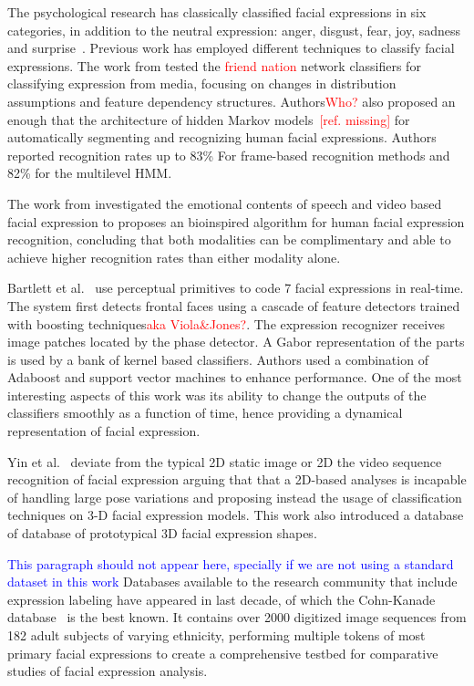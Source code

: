 \documentclass[]{article}
\begin{document}
The psychological research has classically classified facial
expressions in six categories, in addition to the neutral expression:
anger, disgust, fear, joy, sadness and
surprise~\cite{schmidt2002human}. Previous work has employed different
techniques to classify  facial expressions. The work from
\cite{Cohen2003160} tested the \textcolor{red}{friend nation} network
classifiers for classifying expression from media, focusing on changes
in distribution assumptions and feature dependency
structures. Authors\textcolor{red}{Who?} also proposed an enough that
the architecture of hidden Markov
models~\textcolor{red}{[ref. missing]} for automatically segmenting and  
recognizing human facial expressions. Authors reported recognition
rates up to 83\% For frame-based recognition methods and 82\% for the
multilevel HMM.

The work from \cite{Chen670976} investigated the emotional contents of speech and video based facial expression to
proposes an bioinspired algorithm for human facial expression recognition, concluding that both modalities can be
complimentary and able to achieve higher recognition rates than either modality alone.


Bartlett et al.~\cite{Bartlett4624313} use perceptual primitives to
code 7 facial expressions in real-time. The system first detects
frontal faces using a cascade of feature detectors trained
with boosting techniques\textcolor{red}{aka Viola\&Jones?}. The
expression recognizer receives image patches located by the phase
detector. A Gabor representation of the parts is used  by a bank of
kernel based classifiers. Authors used a combination of Adaboost and
support vector machines to enhance performance. One of the most
interesting aspects of this work was its ability to change the
outputs of the classifiers smoothly as a function of time, hence
providing a dynamical representation of facial expression.

Yin et al.~\cite{lijunyin} deviate from the typical 2D static
image or 2D the video sequence recognition of facial expression 
arguing that that a 2D-based analyses is incapable of handling large
pose variations and proposing instead the usage of classification
techniques on 3-D facial expression models. This work also introduced
a database of database of prototypical 3D facial expression shapes.

\textcolor{blue}{This paragraph should not appear here, specially if we are not using a
  standard dataset in this work}
Databases available to the research community that include expression
labeling have appeared in last decade, of which the Cohn-Kanade
database~\cite{Cohn840611} is the best known. It contains over 2000 digitized image sequences from  182 adult subjects of
varying ethnicity, performing multiple tokens of most primary facial expressions to create a comprehensive testbed for
comparative studies of facial expression analysis.
\end{document}
